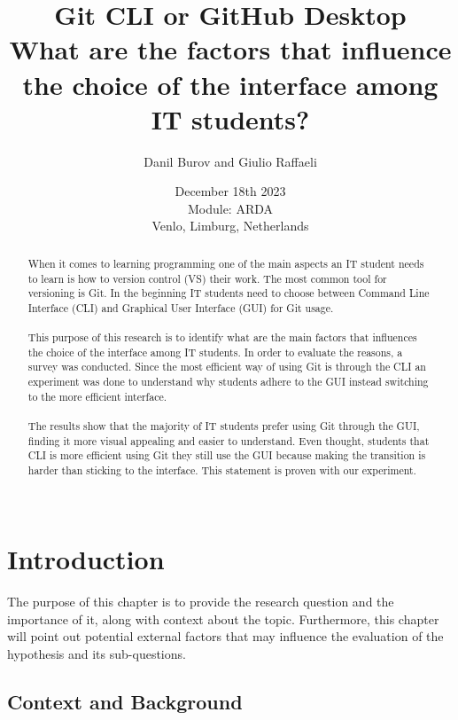 \documentclass[]{report}
\title{Git CLI or GitHub Desktop \\ What are the factors that influence the choice of the interface among IT students?}
\author{Danil Burov and Giulio Raffaeli}
\date{December 18th 2023\\Module: ARDA \\Venlo, Limburg, Netherlands}
\begin{document}
	
	\maketitle
	

	\begin{abstract}
		When it comes to learning programming one of the main aspects an IT student needs to learn is how to version control (VS) their work. The most common tool for versioning is Git. In the beginning IT students need to choose between Command Line Interface (CLI) and Graphical User Interface (GUI) for Git usage. \\\\
		
		
		This purpose of this research is to identify what are the main factors that influences the choice of the interface among IT students. In order to evaluate the reasons, a survey was conducted. Since the most efficient way of using Git is through the CLI an experiment was done to understand why students adhere to the GUI instead switching to the more efficient interface.\\\\
		
		The results show that the majority of IT students prefer using Git through the GUI, finding it more visual appealing and easier to understand. Even thought, students that CLI is more efficient using Git they still use the GUI because making the transition is harder than sticking to the interface. This statement is proven with our experiment.\\\\
		
	\end{abstract}
	\tableofcontents
	\setcounter{page}{3}
	\listoffigures %
	\pagebreak
	
	
	\section{Introduction}
	The purpose of this chapter is to provide the research question and the importance of it, along with context about the topic. Furthermore, this chapter will point out potential external factors that may influence the evaluation of the hypothesis and its sub-questions. \\
	\subsection{Context and Background}
	
\end{document}
